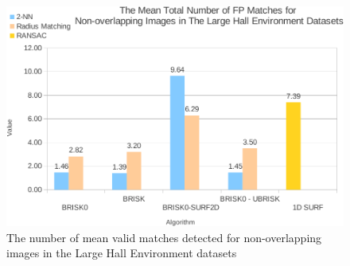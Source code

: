 \documentclass{report}
\begin{document}
% 
%


\begin{figure}
  \centering
    \includegraphics[width=1.0\textwidth]{../Drawings/Graphs/lh_nvm_nol.pdf}
    \caption{The number of mean valid matches detected for non-overlapping images in the Large Hall Environment datasets} 
    \label{fig:lh_nvm_nol}
\end{figure}
\end{document}
